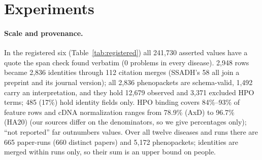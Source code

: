 \documentclass{article} %
\begin{document}
\section{Experiments}
\label{sec:experiments}
\begin{table}[t]
\caption{Registered six (frozen pipeline, runs of 2026-10-20). Span-check problems are 0 in every row. Gatekeeper shares (counts; exact 95\% CI) are a second model read, not error rates. HA20 is the development disease.}
\label{tab:registered}
\begin{center}
\end{center}
\end{table}

\paragraph{Scale and provenance.} In the registered six (Table~\ref{tab:registered}) all 241,730 asserted values have a quote the span check found verbatim (0 problems in every disease). 2,948 rows became 2,836 identities through 112 citation merges (SSADH's 58 all join a preprint and its journal version); all 2,836 phenopackets are schema-valid, 1,492 carry an interpretation, and they hold 12,679 observed and 3,371 excluded HPO terms; 485 (17\%) hold identity fields only. HPO binding covers 84\%--93\% of feature rows and cDNA normalization ranges from 78.9\% (AxD) to 96.7\% (HA20) (our sources differ on the denominators, so we give percentages only); ``not reported'' far outnumbers values. Over all twelve diseases and runs there are 665 paper-runs (660 distinct papers) and 5,172 phenopackets; identities are merged within runs only, so their sum is an upper bound on people.
\end{document}
